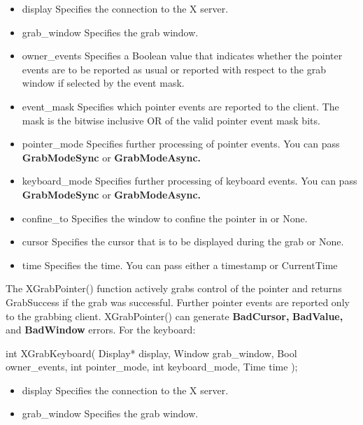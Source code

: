 \documentclass{report}
\begin{document}
\begin{itemize}
\begin{itemize}
                \item display	Specifies the connection to the X server.
                \item grab\_window	Specifies the grab window.
                \item owner\_events	Specifies a Boolean value that indicates whether the pointer events are to be reported as usual or reported with respect to the grab window if selected by the event mask.
                \item event\_mask	Specifies which pointer events are reported to the client. The mask is the bitwise inclusive OR of the valid pointer event mask bits.
                \item pointer\_mode	Specifies further processing of pointer events. You can pass \textbf{GrabModeSync} or \textbf{GrabModeAsync.}
                \item keyboard\_mode	Specifies further processing of keyboard events. You can pass \textbf{GrabModeSync} or \textbf{GrabModeAsync.}
                \item confine\_to	Specifies the window to confine the pointer in or None.
                \item cursor	Specifies the cursor that is to be displayed during the grab or None.
                \item time	Specifies the time. You can pass either a timestamp or CurrentTime
            \end{itemize}
            \bigbreak \noindent 
            The XGrabPointer() function actively grabs control of the pointer and returns GrabSuccess if the grab was successful. Further pointer events are reported only to the grabbing client. XGrabPointer() can generate \textbf{BadCursor,} \textbf{BadValue,} and \textbf{BadWindow} errors.
            \bigbreak \noindent 
            For the keyboard:
            \bigbreak \noindent 
            \begin{cppcode}
                int XGrabKeyboard(
                    Display* display,
                    Window grab_window,
                    Bool owner_events,
                    int pointer_mode,
                    int keyboard_mode,
                    Time time
                );
            \end{cppcode}
            \begin{itemize}
                \item display	Specifies the connection to the X server.
                \item grab\_window	Specifies the grab window.

\end{itemize}
\end{itemize}
\end{document}
